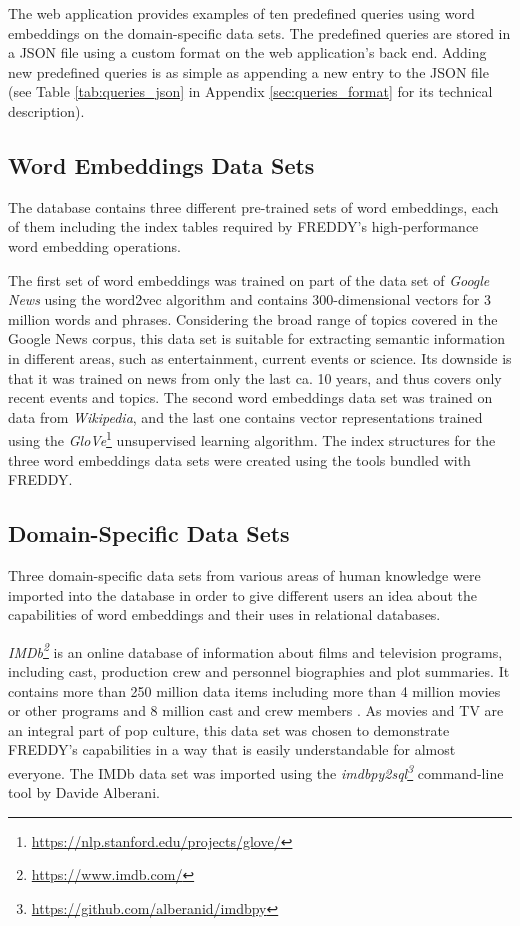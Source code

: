 The web application provides examples of ten predefined queries using word embeddings on the domain-specific data sets. The predefined queries are stored in a JSON file using a custom format on the web application's back end. Adding new predefined queries is as simple as appending a new entry to the JSON file (see Table \ref{tab:queries_json} in Appendix \ref{sec:queries_format} for its technical description). 

\subsection{Word Embeddings Data Sets}
\label{sec:datasets}
The database contains three different pre-trained sets of word embeddings, each of them including the index tables required by FREDDY's high-performance word embedding operations.

The first set of word embeddings was trained on part of the data set of \textit{Google News} using the word2vec algorithm and contains 300-dimensional vectors for 3 million words and phrases. Considering the broad range of topics covered in the Google News corpus, this data set is suitable for extracting semantic information in different areas, such as entertainment, current events or science. Its downside is that it was trained on news from only the last ca. 10 years, and thus covers only recent events and topics. The second word embeddings data set was trained on data from \textit{Wikipedia}, and the last one contains vector representations trained using the \textit{GloVe}\footnote{\url{https://nlp.stanford.edu/projects/glove/}} unsupervised learning algorithm. The index structures for the three word embeddings data sets were created using the tools bundled with FREDDY.

\subsection{Domain-Specific Data Sets}
Three domain-specific data sets from various areas of human knowledge were imported into the database in order to give different users an idea about the capabilities of word embeddings and their uses in relational databases.

\textit{IMDb\footnote{\url{https://www.imdb.com/}}} is an online database of information about films and television programs, including cast, production crew and personnel biographies and plot summaries. It contains more than 250 million data items including more than 4 million movies or other programs and 8 million cast and crew members \cite{imdb-about}. As movies and TV are an integral part of pop culture, this data set was chosen to demonstrate FREDDY's capabilities in a way that is easily understandable for almost everyone. The IMDb data set was imported using the \textit{imdbpy2sql\footnote{\url{https://github.com/alberanid/imdbpy}}} command-line tool by Davide Alberani.

